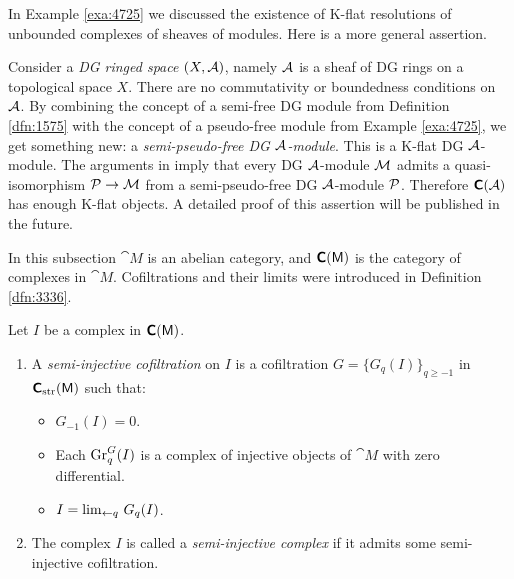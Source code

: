 \begin{rem} \label{rem:4675}
In Example \ref{exa:4725} we discussed the existence of K-flat resolutions of 
unbounded complexes of sheaves of modules. Here is a more general assertion. 

Consider a {\em DG ringed space} $(X, \AA)$, namely $\AA$ is a 
sheaf of DG rings on a topological space $X$. There are no commutativity or 
boundedness conditions on $\AA$. By combining the concept of a 
semi-free DG module from Definition \ref{dfn:1575} with the concept of a 
pseudo-free module from Example \ref{exa:4725}, we get something new: a {\em 
semi-pseudo-free DG $\AA$-module}. This is a K-flat DG $\AA$-module. The 
arguments in \cite{Ye15} imply that every DG $\AA$-module $\MM$ admits a 
quasi-isomorphism $\PP \to \MM$ from a semi-pseudo-free DG $\AA$-module $\PP$.
Therefore $\dcat{C}(\AA)$ has enough K-flat objects.  
A detailed proof of this assertion will be published in the future. 
\end{rem}




\label{subsec:exis-K-inj}

In this subsection $\cat{M}$ is an abelian category, and $\dcat{C}(\cat{M})$ 
is the category of complexes in $\cat{M}$. Cofiltrations and their limits were 
introduced in Definition \ref{dfn:3336}.

\begin{dfn} \label{dfn:1620}
Let $I$ be a complex in $\dcat{C}(\cat{M})$. 
\begin{enumerate}
\item A {\em semi-injective cofiltration}%
on $I$ is a cofiltration $G = \{ G_q(I) \}_{q \geq -1}$
in $\dcat{C}_{\mrm{str}}(\cat{M})$ such that:
\begin{itemize}
\item $G_{-1}(I) = 0$. 

\item  Each $\opn{Gr}_q^G(I)$ 
is a complex of injective objects of $\cat{M}$ with zero differential.

\item $I = \lim_{\lar q} \, G_q(I)$.
\end{itemize}

\item The complex $I$ is called a {\em semi-injective complex}%
if it admits some semi-injective cofiltration. 
\end{enumerate}
\end{dfn}


